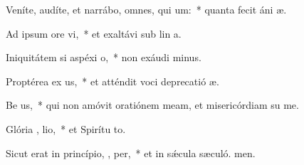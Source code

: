 \item Veníte, audíte, et narrábo, omnes, qui  um:~* quanta fecit áni æ.
\item Ad ipsum ore  vi,~* et exaltávi sub lin a.
\item Iniquitátem si aspéxi   o,~* non exáudi minus.
\item Proptérea ex us,~* et atténdit voci deprecatió æ.
\item Be us,~* qui non amóvit oratiónem meam, et misericórdiam su  me.
\item Glória ,  lio,~* et Spirítu to.
\item Sicut erat in princípio,  ,  per,~* et in sǽcula sæculó. men.
